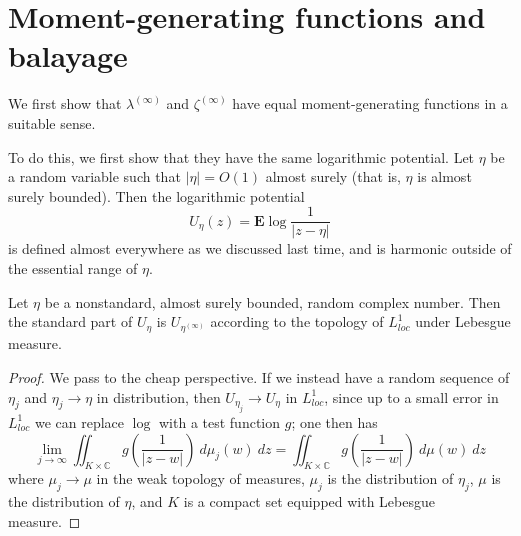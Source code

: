 \documentclass[12pt]{article}
\newcommand{\CC}{\mathbb{C}}
\begin{document}
\section{Moment-generating functions and balayage}
We first show that $\lambda^{(\infty)}$ and $\zeta^{(\infty)}$ have equal moment-generating functions in a suitable sense.

To do this, we first show that they have the same logarithmic potential.
Let $\eta$ be a random variable such that $|\eta| = O(1)$ almost surely (that is, $\eta$ is almost surely bounded).
Then the logarithmic potential
$$U_\eta(z) = \mathbf E \log \frac{1}{|z - \eta|}$$
is defined almost everywhere as we discussed last time, and is harmonic outside of the essential range of $\eta$.

\begin{lemma}
Let $\eta$ be a nonstandard, almost surely bounded, random complex number.
Then the standard part of $U_\eta$ is $U_{\eta^{(\infty)}}$ according to the topology of $L^1_{loc}$ under Lebesgue measure.
\end{lemma}
\begin{proof}
We pass to the cheap perspective.
If we instead have a random sequence of $\eta_j$ and $\eta_j \to \eta$ in distribution, then $U_{\eta_j} \to U_\eta$ in $L^1_{loc}$, since up to a small error in $L^1_{loc}$ we can replace $\log$ with a test function $g$; one then has
$$\lim_{j \to \infty} \iint_{K \times \CC} g\left(\frac{1}{|z - w|}\right) ~d\mu_j(w) ~dz = \iint_{K \times \CC} g\left(\frac{1}{|z - w|}\right) ~d\mu(w) ~dz$$
where $\mu_j \to \mu$ in the weak topology of measures, $\mu_j$ is the distribution of $\eta_j$, $\mu$ is the distribution of $\eta$, and $K$ is a compact set equipped with Lebesgue measure.
\end{proof}
\end{document}
